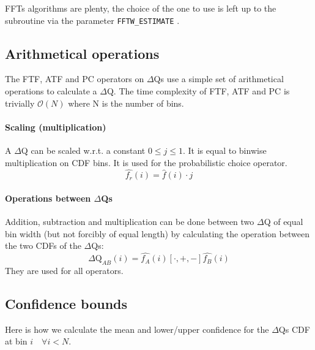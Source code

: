     FFTs algorithms are plenty, the choice of the one to use is left up to the subroutine via the parameter \texttt{FFTW\_ESTIMATE} \cite{fft-h}.

    \subsection{Arithmetical operations}
        The FTF, ATF and PC operators on $\Delta$Qs use a simple set of arithmetical operations to calculate a $\Delta$Q.   
    The time complexity of FTF, ATF and PC is trivially $\mathcal{O}(N)$ where N is the number of bins.
 
    \paragraph{Scaling (multiplication)} A $\Delta$Q can be scaled w.r.t. a constant $0 \le j \le 1$. It is equal to binwise multiplication on CDF bins. It is used for the probabilistic choice operator.
    \begin{equation}
        \hat{f_r}(i) = \hat{f}(i) \cdot j
        \label{eq:mul_ecdf}
    \end{equation}

    \paragraph{Operations between $\Delta$Qs} 
        Addition, subtraction and multiplication can be done between two $\Delta$Q of equal bin width (but not forcibly of equal length) by calculating the operation between the two CDFs of the $\Delta$Qs:
        \begin{equation}
            \Delta \text{Q}_{AB}(i) = \hat{f_A}(i) [\cdot, +, -] \hat{f_B}(i)
            \label{eq:op_dq}
        \end{equation}
    They are used for all operators.

    \subsection{Confidence bounds}
        Here is how we calculate the mean and lower/upper confidence for the $\Delta$Qs CDF at bin $i \quad \forall i < N$. \cite{stat}


